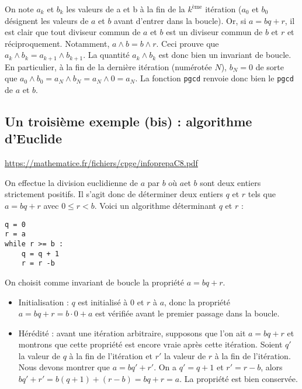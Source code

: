 On note $a_k$ et $b_k$ les valeurs de a et b à la fin de la $k^\text{ème}$ itération ($a_0$ et $b_0$ désignent les valeurs de $a$ et $b$ avant d'entrer dans la boucle). Or, si $a=bq+r$, il est clair que tout diviseur commun de $a$ et $b$ est un diviseur commun de $b$ et $r$ et réciproquement. Notamment, $a\wedge b=b\wedge r$. Ceci prouve que $a_k\wedge b_k=a_{k+1}\wedge b_{k+1}$. La quantité $a_k\wedge b_k$ est donc bien un invariant de boucle. En particulier, à la fin de la dernière itération (numérotée $N$), $b_N=0$ de sorte que $a_0\wedge b_0=a_N\wedge b_N=a_N\wedge0=a_N$. La fonction \texttt{pgcd} renvoie donc bien le \texttt{pgcd} de $a$ et $b$.

\subsection{Un troisième exemple (bis) : algorithme d'Euclide}
\url{https://mathematice.fr/fichiers/cpge/infoprepaC8.pdf}

On effectue la division euclidienne de $a$ par $b$ où $a $et $b$ sont deux entiers strictement positifs. Il s’agit
donc de déterminer deux entiers $q$ et $r$ tels que $a = bq+r$ avec $0 \leq r < b$. Voici un algorithme déterminant
$q$ et $r$ :

\begin{lstlisting}
q = 0
r = a
while r >= b :
    q = q + 1
    r = r -b
\end{lstlisting}

On choisit comme invariant de boucle la propriété $a = bq + r$.
\begin{itemize}
\item Initialisation : $q$ est initialisé à 0 et $r$ à $a$, donc la propriété $a = bq + r = b\cdot 0 + a$ est vérifiée avant le premier passage dans la boucle.
\item Hérédité : avant une itération arbitraire, supposons que l’on ait $a = bq + r$ et montrons que cette propriété est encore vraie après cette itération. Soient $q'$ la valeur de $q$ à la fin de l’itération et $r'$ la valeur de $r$ à la fin de l’itération. Nous devons montrer que $a = bq' + r'$. On a $q'= q + 1$ et $r' = r- b$, alors $bq' + r' = b(q + 1) + (r - b) = bq + r = a$. La propriété est bien conservée.
\end{itemize}


